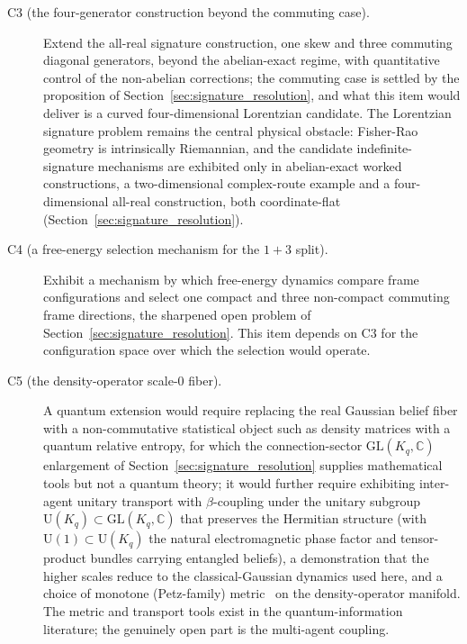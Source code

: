 \documentclass[11pt]{article}
\begin{document}
\begin{description}
\item[C3 (the four-generator construction beyond the commuting case).] Extend the all-real signature construction, one skew and three commuting diagonal generators, beyond the abelian-exact regime, with quantitative control of the non-abelian corrections; the commuting case is settled by the proposition of Section~\ref{sec:signature_resolution}, and what this item would deliver is a curved four-dimensional Lorentzian candidate. The Lorentzian signature problem remains the central physical obstacle: Fisher-Rao geometry is intrinsically Riemannian, and the candidate indefinite-signature mechanisms are exhibited only in abelian-exact worked constructions, a two-dimensional complex-route example and a four-dimensional all-real construction, both coordinate-flat (Section~\ref{sec:signature_resolution}).
\item[C4 (a free-energy selection mechanism for the $1{+}3$ split).] Exhibit a mechanism by which free-energy dynamics compare frame configurations and select one compact and three non-compact commuting frame directions, the sharpened open problem of Section~\ref{sec:signature_resolution}. This item depends on C3 for the configuration space over which the selection would operate.
\item[C5 (the density-operator scale-0 fiber).] A quantum extension would require replacing the real Gaussian belief fiber with a non-commutative statistical object such as density matrices with a quantum relative entropy, for which the connection-sector $\mathrm{GL}(K_q, \mathbb{C})$ enlargement of Section~\ref{sec:signature_resolution} supplies mathematical tools but not a quantum theory; it would further require exhibiting inter-agent unitary transport with $\beta$-coupling under the unitary subgroup $\mathrm{U}(K_q) \subset \mathrm{GL}(K_q, \mathbb{C})$ that preserves the Hermitian structure (with $\mathrm{U}(1) \subset \mathrm{U}(K_q)$ the natural electromagnetic phase factor and tensor-product bundles carrying entangled beliefs), a demonstration that the higher scales reduce to the classical-Gaussian dynamics used here, and a choice of monotone (Petz-family) metric~\cite{Petz1996} on the density-operator manifold. The metric and transport tools exist in the quantum-information literature; the genuinely open part is the multi-agent coupling.

\end{description}
\end{document}
